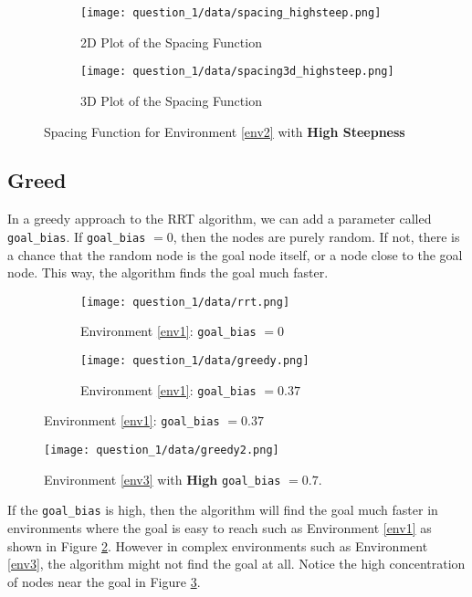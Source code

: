 \documentclass[12pt]{report}
\begin{document}
\begin{figure}[H]
    \centering
    \begin{subfigure}{0.4\textwidth}
        \texttt{[image: question\_1/data/spacing\_highsteep.png]}
        \caption{2D Plot of the Spacing Function}
    \end{subfigure}
    \begin{subfigure}{0.4\textwidth}
        \texttt{[image: question\_1/data/spacing3d\_highsteep.png]}
        \caption{3D Plot of the Spacing Function}
    \end{subfigure}
    \caption{Spacing Function for Environment \ref{env2} with \textbf{High Steepness}}
\end{figure}

\subsection{Greed}

In a greedy approach to the RRT algorithm, we can add a parameter called \texttt{goal\_bias}. If \texttt{goal\_bias} $=0$, then the nodes are purely random. If not, there is a chance that the random node is the goal node itself, or a node close to the goal node. This way, the algorithm finds the goal much faster.

\begin{figure}[H]
    \centering
    \begin{subfigure}{0.4\textwidth}
        \texttt{[image: question\_1/data/rrt.png]}
        \caption{Environment \ref{env1}: \texttt{goal\_bias} $=0$}
    \end{subfigure}
    \begin{subfigure}{0.4\textwidth}
        \texttt{[image: question\_1/data/greedy.png]}
        \caption{Environment \ref{env1}: \texttt{goal\_bias} $=0.37$}
        \label{fig:greedy}
    \end{subfigure}
\end{figure}

\begin{figure}[H]
    \centering
    \texttt{[image: question\_1/data/greedy2.png]}
    \caption{Environment \ref{env3} with \textbf{High} \texttt{goal\_bias} $=0.7$.}
    \label{fig:greedy2}
\end{figure}

If the \texttt{goal\_bias} is high, then the algorithm will find the goal much faster in environments where the goal is easy to reach such as Environment \ref{env1} as shown in Figure \ref{fig:greedy}. However in complex environments such as Environment \ref{env3}, the algorithm might not find the goal at all. Notice the high concentration of nodes near the goal in Figure \ref{fig:greedy2}.
\end{document}
